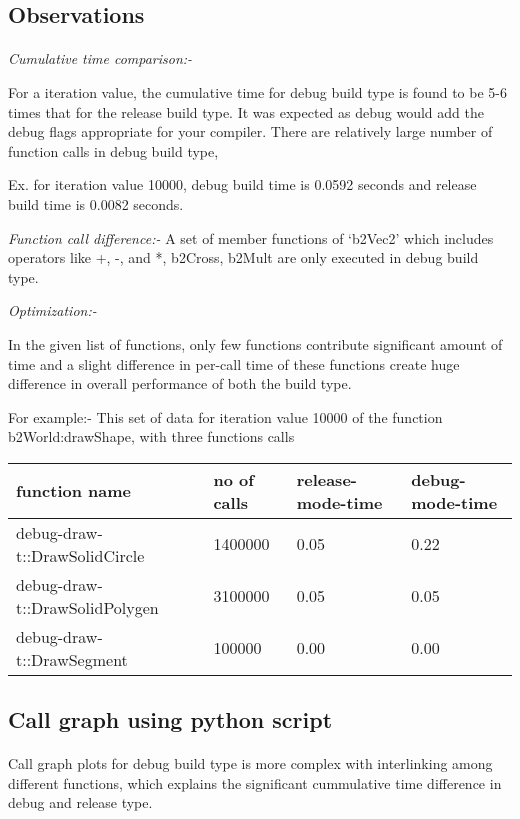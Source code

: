 \documentclass[11pt]{article}
\begin{document}
\subsection{Observations}
\paragraph{}
\textit{Cumulative time comparison:-}


For a iteration value, the cumulative time for debug build type is found to be 5-6 times that for the release build type.
 It was expected as debug would add the debug flags appropriate for your compiler. 
 There are relatively large number of function calls in debug build type,

Ex. for iteration value 10000, debug build time is 0.0592 seconds and release build time is 0.0082 seconds.

\setlength{\parskip}{10pt plus 1pt}
\textit{Function call difference:-}
A set of member functions of ‘b2Vec2’ which includes operators like +, -, and *, b2Cross, b2Mult 
are only executed in debug build type. 

\setlength{\parskip}{10pt plus 1pt}
\textit{Optimization:-}

In the given list of functions, only few functions contribute significant amount of time and a slight difference
 in per-call time of these functions create huge difference in overall performance of both the build type.

For example:- This set of data for iteration value 10000 of the function 
b2World:drawShape, with three functions calls 

\setlength{\parskip}{10pt plus 1pt}

\begin{tabular}{ | l | l | l | l |}
	\hline
  function name  & no of calls & release-mode-time & debug-mode-time \\ \hline
  debug-draw-t::DrawSolidCircle & 1400000 & 0.05 & 0.22 \\ \hline
  debug-draw-t::DrawSolidPolygen & 3100000 & 0.05 & 0.05 \\ \hline
  debug-draw-t::DrawSegment & 100000 & 0.00 & 0.00 \\ \hline
\end{tabular}

\subsection{Call graph using python script}
\paragraph{}
Call graph plots for debug build type is more complex with interlinking among different functions, which explains 
the significant cummulative time difference in debug and release type. 
\end{document}
